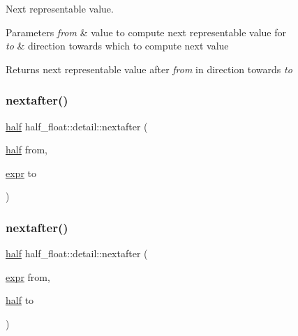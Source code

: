 Next representable value. 
\begin{DoxyParams}{Parameters}
{\em from} & value to compute next representable value for \\
\hline
{\em to} & direction towards which to compute next value \\
\hline
\end{DoxyParams}
\begin{DoxyReturn}{Returns}
next representable value after {\itshape from} in direction towards {\itshape to} 
\end{DoxyReturn}
\mbox{\label{namespacehalf__float_1_1detail_ab1e7231cc386bb596373cf6618d63541}} 
\subsubsection{\texorpdfstring{nextafter()}{nextafter()}\hspace{0.1cm}{\footnotesize\ttfamily [2/4]}}
{\footnotesize\ttfamily \hyperlink{classhalf__float_1_1half}{half} half\+\_\+float\+::detail\+::nextafter (\begin{DoxyParamCaption}\item[{\hyperlink{classhalf__float_1_1half}{half}}]{from,  }\item[{\hyperlink{structhalf__float_1_1detail_1_1expr}{expr}}]{to }\end{DoxyParamCaption})\hspace{0.3cm}{\ttfamily [inline]}}

\mbox{\label{namespacehalf__float_1_1detail_ae9f4932000e04299199ad07b764f9757}} 
\subsubsection{\texorpdfstring{nextafter()}{nextafter()}\hspace{0.1cm}{\footnotesize\ttfamily [3/4]}}
{\footnotesize\ttfamily \hyperlink{classhalf__float_1_1half}{half} half\+\_\+float\+::detail\+::nextafter (\begin{DoxyParamCaption}\item[{\hyperlink{structhalf__float_1_1detail_1_1expr}{expr}}]{from,  }\item[{\hyperlink{classhalf__float_1_1half}{half}}]{to }\end{DoxyParamCaption})\hspace{0.3cm}{\ttfamily [inline]}}

